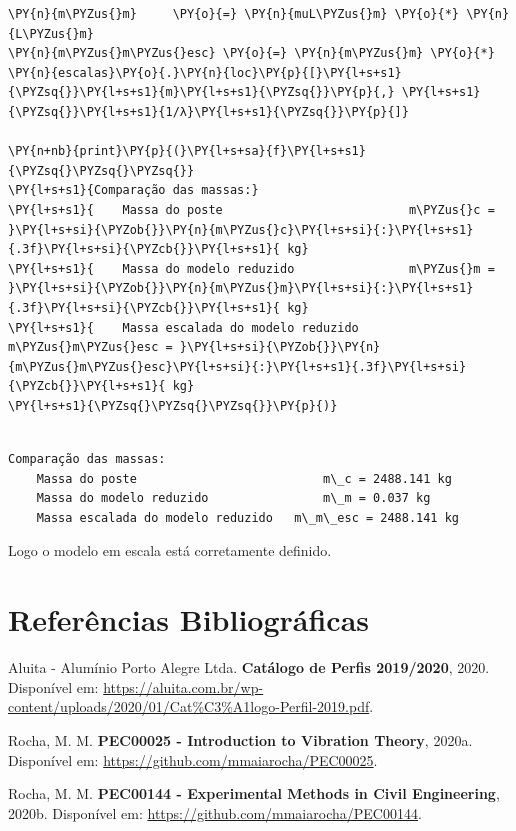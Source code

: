     \begin{tcolorbox}[breakable, size=fbox, boxrule=1pt, pad at break*=1mm,colback=cellbackground, colframe=cellborder]
\begin{Verbatim}[commandchars=\\\{\}]
\PY{n}{m\PYZus{}m}     \PY{o}{=} \PY{n}{muL\PYZus{}m} \PY{o}{*} \PY{n}{L\PYZus{}m}
\PY{n}{m\PYZus{}m\PYZus{}esc} \PY{o}{=} \PY{n}{m\PYZus{}m} \PY{o}{*} \PY{n}{escalas}\PY{o}{.}\PY{n}{loc}\PY{p}{[}\PY{l+s+s1}{\PYZsq{}}\PY{l+s+s1}{m}\PY{l+s+s1}{\PYZsq{}}\PY{p}{,} \PY{l+s+s1}{\PYZsq{}}\PY{l+s+s1}{1/λ}\PY{l+s+s1}{\PYZsq{}}\PY{p}{]}

\PY{n+nb}{print}\PY{p}{(}\PY{l+s+sa}{f}\PY{l+s+s1}{\PYZsq{}\PYZsq{}\PYZsq{}}
\PY{l+s+s1}{Comparação das massas:}
\PY{l+s+s1}{    Massa do poste                          m\PYZus{}c = }\PY{l+s+si}{\PYZob{}}\PY{n}{m\PYZus{}c}\PY{l+s+si}{:}\PY{l+s+s1}{.3f}\PY{l+s+si}{\PYZcb{}}\PY{l+s+s1}{ kg}
\PY{l+s+s1}{    Massa do modelo reduzido                m\PYZus{}m = }\PY{l+s+si}{\PYZob{}}\PY{n}{m\PYZus{}m}\PY{l+s+si}{:}\PY{l+s+s1}{.3f}\PY{l+s+si}{\PYZcb{}}\PY{l+s+s1}{ kg}
\PY{l+s+s1}{    Massa escalada do modelo reduzido   m\PYZus{}m\PYZus{}esc = }\PY{l+s+si}{\PYZob{}}\PY{n}{m\PYZus{}m\PYZus{}esc}\PY{l+s+si}{:}\PY{l+s+s1}{.3f}\PY{l+s+si}{\PYZcb{}}\PY{l+s+s1}{ kg}
\PY{l+s+s1}{\PYZsq{}\PYZsq{}\PYZsq{}}\PY{p}{)}
\end{Verbatim}
\end{tcolorbox}

    \begin{Verbatim}[commandchars=\\\{\}]

Comparação das massas:
    Massa do poste                          m\_c = 2488.141 kg
    Massa do modelo reduzido                m\_m = 0.037 kg
    Massa escalada do modelo reduzido   m\_m\_esc = 2488.141 kg

    \end{Verbatim}

    Logo o modelo em escala está corretamente definido.

    \hypertarget{referuxeancias-bibliogruxe1ficas}{%
\section{Referências
Bibliográficas}\label{referuxeancias-bibliogruxe1ficas}}

Aluita - Alumínio Porto Alegre Ltda. \textbf{Catálogo de Perfis
2019/2020}, 2020. Disponível em:
\url{https://aluita.com.br/wp-content/uploads/2020/01/Cat\%C3\%A1logo-Perfil-2019.pdf}.

Rocha, M. M. \textbf{PEC00025 - Introduction to Vibration Theory},
2020a. Disponível em: \url{https://github.com/mmaiarocha/PEC00025}.

Rocha, M. M. \textbf{PEC00144 - Experimental Methods in Civil
Engineering}, 2020b. Disponível em:
\url{https://github.com/mmaiarocha/PEC00144}.


    
    
    

